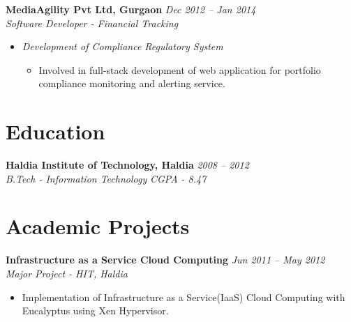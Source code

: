 \documentclass[margin,line]{resume}
\begin{document}
\begin{resume}
    \textbf{MediaAgility Pvt Ltd, Gurgaon}   \hfill \textsl{Dec 2012 -- Jan 2014} \vspace{0mm}\\\vspace{0mm}%
           \textsl{Software Developer - Financial Tracking}\\
    \begin{itemize}
    
     \item \textsl{Development of Compliance Regulatory System} 
        \begin{itemize}
            \item Involved in full-stack development of web application for portfolio compliance monitoring and alerting service.
        \end{itemize}
    
    \end{itemize}
        
    \section{\mysidestyle Education}

    \textbf{Haldia Institute of Technology, Haldia} \hfill \textsl{2008 -- 2012}\vspace{0mm}\\\vspace{0mm}%
    \textsl{B.Tech - Information Technology} \textsl{CGPA - 8.47} \hfill



    \section{\mysidestyle Academic Projects}
    \textbf{Infrastructure as a Service Cloud Computing} \hfill \textsl{Jun 2011 -- May 2012}\vspace{0mm}\\\vspace{0mm}%
    \textsl{Major Project - HIT, Haldia} 
       \begin{itemize} 
	        \item Implementation of Infrastructure as a Service(IaaS) Cloud Computing with Eucalyptus using Xen Hypervisor.
       \end{itemize}


\end{resume}
\end{document}
